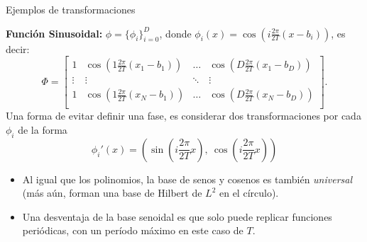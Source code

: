 \documentclass[9pt, handout]{beamer}
\begin{document}
\begin{frame}{Ejemplos de transformaciones}

\noindent\textbf{Función Sinusoidal:} $\phi=\{\phi_i\}_{i=0}^D$, donde $\phi_i(x)=\cos\left(i\frac{2\pi}{2T}(x - b_i)\right)$, es decir:
\begin{equation*}
    \Phi = \left[ \begin{matrix}
    1 & \cos\left(1\frac{2\pi}{2T}(x_1-b_1)\right) & \ldots & \cos\left(D\frac{2\pi}{2T}(x_1-b_D)\right)\\
    \vdots & \vdots  & \ddots & \vdots \\
    1 & \cos\left(1\frac{2\pi}{2T}(x_N-b_1)\right) & \ldots & \cos\left(D\frac{2\pi}{2T}(x_N-b_D)\right)\\
    \end{matrix} \right].
\end{equation*}\pause
Una forma de evitar definir una fase, es considerar dos transformaciones por cada $\phi_i$ de la forma
\begin{equation*}
    \phi_i'(x) = \left(\sin\left(i\frac{2\pi}{2T}x\right),\ \cos\left(i\frac{2\pi}{2T}x\right)\right)
\end{equation*}\pause

\begin{itemize}
	\item Al igual que los polinomios, la base de senos y cosenos es también \emph{universal} (más aún, forman una base de Hilbert de $L^2$ en el círculo).\pause
	\item Una desventaja de la base senoidal es que solo puede replicar funciones periódicas, con un período máximo en este caso  de $T$.
\end{itemize}

\end{frame}
\end{document}
